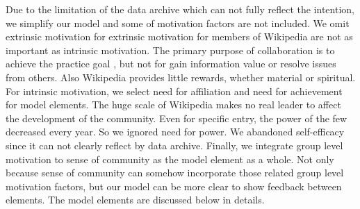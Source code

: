 \documentclass[doublespacing]{elsarticle}
\begin{document}
Due to the limitation of the data archive which can not fully reflect
the intention, we simplify our model and some of motivation factors
are not included. We omit extrinsic motivation for extrinsic
motivation for members of Wikipedia are not as important as intrinsic
motivation. The primary purpose of collaboration is to achieve the practice goal
, but not for gain information value or resolve issues from others. Also
Wikipedia  provides little rewards, whether material or
spiritual. For intrinsic motivation,    we select need for affiliation
and need for achievement for model elements. The huge scale of
Wikipedia makes no real leader to affect the development of the community. Even for specific entry, the power of the few decreased
every year\cite{poweroffew}. So we ignored need for power. We
abandoned self-efficacy since it can not clearly reflect by data
archive.
Finally, we integrate group level motivation to sense of community as
the model element as a whole\cite{mcmillan1986scd}. Not only because
sense of community can somehow incorporate those related group level
motivation factors, but our model  can be more clear to show
feedback between elements.  The model elements are discussed below
in details. 
\end{document}

